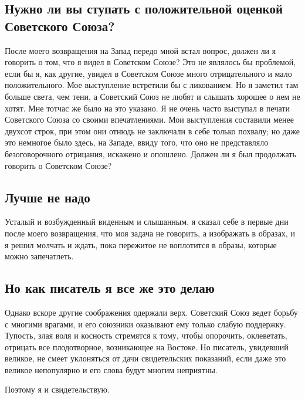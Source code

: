 \documentclass[12pt, a4paper, openany]{book}
\begin{document}
\subsection*{Нужно  ли  вы ступать с положительной оценкой Советского  Союза?}

После моего возвращения на Запад передо мной встал вопрос, должен ли я  говорить о том, что я видел в Советском Союзе? Это не являлось бы проблемой, если бы я, как   другие,  увидел   в  Советском  Союзе  много  отрицательного  и   мало положительного. Мое выступление встретили бы с ликованием. Но я  заметил там больше света, чем тени, а Советский Союз не любят и слышать хорошее о нем не хотят. Мне тотчас же было на это указано. Я не очень часто выступал в печати Советского  Союза со своими впечатлениями. Мои выступления  составили  менее двухсот  строк, при этом они отнюдь  не заключали  в себе только похвалу; но даже это немногое было здесь, на Западе, ввиду того, что оно не представляло безоговорочного отрицания, искажено и  опошлено. Должен ли я был  продолжать говорить о Советском Союзе?

\subsection*{Лучше  не надо}

Усталый и  возбужденный виденным и слышанным, я  сказал себе в  первые дни  после моего возвращения, что моя  задача не говорить,  а изображать  в  образах,  и  я  решил  молчать  и  ждать,  пока  пережитое не воплотится в образы, которые можно запечатлеть.

\subsection*{Но как писатель я все  же это  делаю}

Однако вскоре  другие соображения одержали верх. Советский Союз ведет борьбу с многими врагами, и его союзники оказывают  ему  только  слабую  поддержку.  Тупость,  злая  воля  и косность стремятся к  тому,  чтобы опорочить, оклеветать, отрицать все  плодотворное, возникающее на Востоке. Но писатель, увидевший великое, не  смеет уклоняться от  дачи  свидетельских показаний, если даже  это великое непопулярно  и его слова будут многим неприятны.

Поэтому я и свидетельствую.
\end{document}
